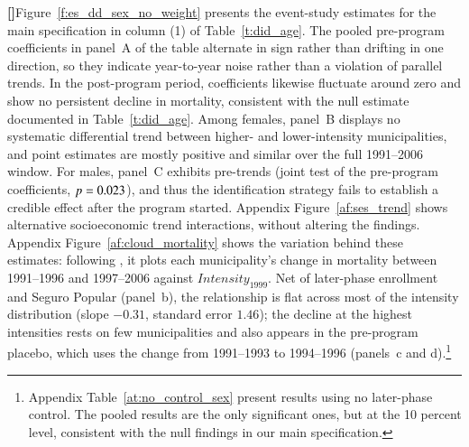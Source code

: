 \documentclass[12pt]{article}
\newcounter{paragraphnum}
\newcommand{\p}{\refstepcounter{paragraphnum}\textbf{[\theparagraphnum]}\enspace}
\begin{document}
\p Figure~\ref{f:es_dd_sex_no_weight} presents the event-study estimates for the main specification in column (1) of Table~\ref{t:did_age}. The pooled pre-program coefficients in panel~A of the table alternate in sign rather than drifting in one direction, so they indicate year-to-year noise rather than a violation of parallel trends. In the post-program period, coefficients likewise fluctuate around zero and show no persistent decline in mortality, consistent with the null estimate documented in Table~\ref{t:did_age}. Among females, panel~B displays no systematic differential trend between higher- and lower-intensity municipalities, and point estimates are mostly positive and similar over the full 1991--2006 window. For males, panel~C exhibits pre-trends (joint test of the pre-program coefficients, $p=0.023$), and thus the identification strategy fails to establish a credible effect after the program started. Appendix Figure~\ref{af:ses_trend} shows alternative socioeconomic trend interactions, without altering the findings. Appendix Figure~\ref{af:cloud_mortality} shows the variation behind these estimates: following \citet{callaway2025continuous}, it plots each municipality's change in mortality between 1991--1996 and 1997--2006 against $\textit{Intensity}_{1999}$. Net of later-phase enrollment and Seguro Popular (panel~b), the relationship is flat across most of the intensity distribution (slope $-0.31$, standard error $1.46$); the decline at the highest intensities rests on few municipalities and also appears in the pre-program placebo, which uses the change from 1991--1993 to 1994--1996 (panels~c and d).\footnote{Appendix Table~\ref{at:no_control_sex} present results using no later-phase control. The pooled results are the only significant ones, but at the 10 percent level, consistent with the null findings in our main specification.}
\end{document}

